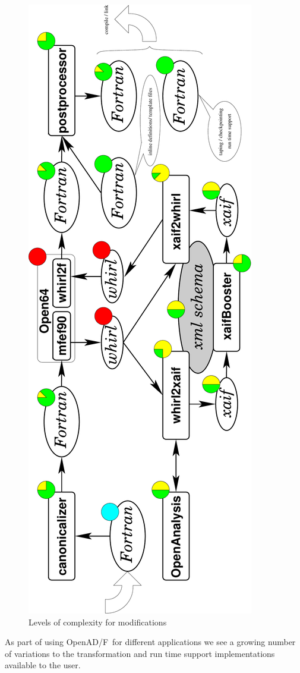 \documentclass{book}
\newcommand{\OpenADF}{OpenAD/F}
\begin{document}
\begin{figure}
\begin{center}
\includegraphics[angle=-90,width=\textwidth,origin=c]{overview2}
\end{center}
\vspace*{-4cm}
\caption{Levels of complexity for modifications}\label{fig:pipelineIntervention}
\end{figure} 
As part of using \OpenADF\ for different applications we see a growing number of 
variations to the  transformation and run time support implementations available 
to the user.
\end{document}
